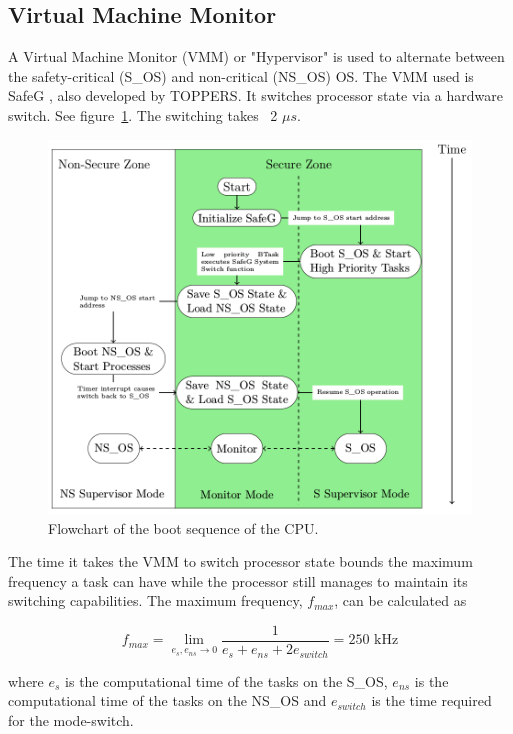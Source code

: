 \subsection{Virtual Machine Monitor}
A Virtual Machine Monitor (VMM) or "Hypervisor" is used to alternate between the safety-critical (S\_OS) and non-critical (NS\_OS) OS. The VMM used is SafeG \cite{website:safeg}, also developed by TOPPERS. It switches processor state via a hardware switch. See figure~\ref{fig:modeswitch}. The switching takes ~2 $\mu s$.

\begin{figure}[H]
\centering
\includegraphics[width=\textwidth]{./img/literature_modeswitch.png}
\caption{Flowchart of the boot sequence of the CPU. \cite{zaki2016}}\label{fig:modeswitch}
\end{figure}

The time it takes the VMM to switch processor state bounds the maximum frequency a task can have while the processor still manages to maintain its switching capabilities. The maximum frequency, $f_{max}$, can be calculated as

$$f_{max} = \lim_{e_s, e_{ns} \to 0} \frac{1}{e_s+e_{ns}+2e_{switch}} = 250\textrm{ kHz}$$

where $e_s$ is the computational time of the tasks on the S\_OS, $e_{ns}$ is the computational time of the tasks on the NS\_OS and $e_{switch}$ is the time required for the mode-switch.\\

